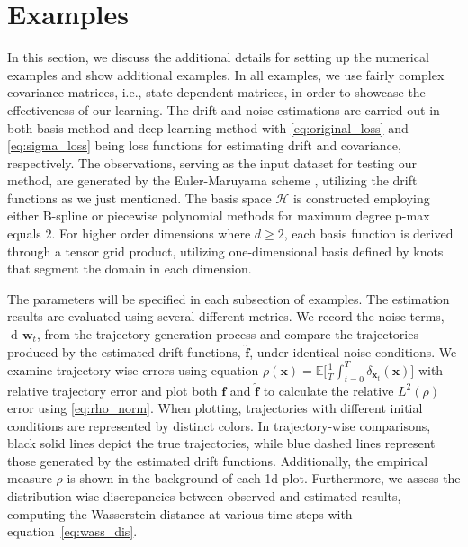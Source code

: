 \documentclass[11pt]{article} %
\def\eqref#1{equation~\ref{#1}}
\def\rvw{{\mathbf{w}}}
\def\rvx{{\mathbf{x}}}
\def\vf{{\bm{f}}}
\def\gH{{\mathcal{H}}}
\newcommand{\E}{\mathbb{E}}
\DeclareMathOperator{\dif}{d \!}        %
\begin{document}
\section{Examples}
%
In this section, we discuss the additional details for setting up the numerical examples and show additional examples.  In all examples, we use fairly complex covariance matrices, i.e., state-dependent matrices, in order to showcase the effectiveness of our learning.  The drift and noise estimations are carried out in both basis method and deep learning method with \ref{eq:original_loss} and \ref{eq:sigma_loss} being loss functions for estimating drift and covariance, respectively. The observations, serving as the input dataset for testing our method, are generated by the Euler-Maruyama scheme \cite{doi:10.1137/S0036144500378302}, utilizing the drift functions as we just mentioned. The basis space $\gH$ is constructed employing either B-spline or piecewise polynomial methods for maximum degree p-max equals $2$. For higher order dimensions where $d \geq 2$, each basis function is derived through a tensor grid product, utilizing one-dimensional basis defined by knots that segment the domain in each dimension. 

The parameters will be specified in each subsection of examples. The estimation results are evaluated using several different metrics. We record the noise terms, $\dif \rvw_t$, from the trajectory generation process and compare the trajectories produced by the estimated drift functions, $\hat{\vf}$, under identical noise conditions. We examine trajectory-wise errors using equation $\rho(\rvx) = \E\Big[\frac{1}{T}\int_{t = 0}^T\delta_{\rvx_t}(\rvx)\Big]$ with relative trajectory error and plot both $\vf$ and $\hat{\vf}$ to calculate the relative $L^2(\rho)$ error using \ref{eq:rho_norm}. When plotting, trajectories with different initial conditions are represented by distinct colors. In trajectory-wise comparisons, black solid lines depict the true trajectories, while blue dashed lines represent those generated by the estimated drift functions. Additionally, the empirical measure $\rho$ is shown in the background of each 1d plot. Furthermore, we assess the distribution-wise discrepancies between observed and estimated results, computing the Wasserstein distance at various time steps with \eqref{eq:wass_dis}. 
%
\end{document}
